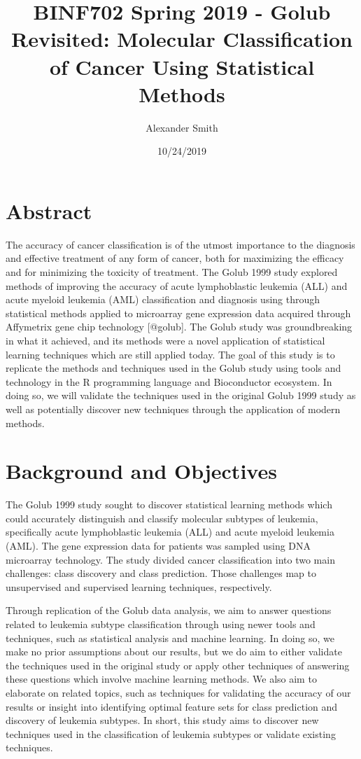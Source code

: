 \documentclass[]{article}
\title{BINF702 Spring 2019 - Golub Revisited: Molecular Classification of
Cancer Using Statistical Methods}
\author{Alexander Smith}
\date{10/24/2019}
\begin{document}
\maketitle

\section{Abstract}\label{abstract}

The accuracy of cancer classification is of the utmost importance to the
diagnosis and effective treatment of any form of cancer, both for
maximizing the efficacy and for minimizing the toxicity of treatment.
The Golub 1999 study explored methods of improving the accuracy of acute
lymphoblastic leukemia (ALL) and acute myeloid leukemia (AML)
classification and diagnosis using through statistical methods applied
to microarray gene expression data acquired through Affymetrix gene chip
technology {[}@golub{]}. The Golub study was groundbreaking in what it
achieved, and its methods were a novel application of statistical
learning techniques which are still applied today. The goal of this
study is to replicate the methods and techniques used in the Golub study
using tools and technology in the R programming language and
Bioconductor ecosystem. In doing so, we will validate the techniques
used in the original Golub 1999 study as well as potentially discover
new techniques through the application of modern methods.

\section{Background and Objectives}\label{background-and-objectives}

The Golub 1999 study sought to discover statistical learning methods
which could accurately distinguish and classify molecular subtypes of
leukemia, specifically acute lymphoblastic leukemia (ALL) and acute
myeloid leukemia (AML). The gene expression data for patients was
sampled using DNA microarray technology. The study divided cancer
classification into two main challenges: class discovery and class
prediction. Those challenges map to unsupervised and supervised learning
techniques, respectively.

Through replication of the Golub data analysis, we aim to answer
questions related to leukemia subtype classification through using newer
tools and techniques, such as statistical analysis and machine learning.
In doing so, we make no prior assumptions about our results, but we do
aim to either validate the techniques used in the original study or
apply other techniques of answering these questions which involve
machine learning methods. We also aim to elaborate on related topics,
such as techniques for validating the accuracy of our results or insight
into identifying optimal feature sets for class prediction and discovery
of leukemia subtypes. In short, this study aims to discover new
techniques used in the classification of leukemia subtypes or validate
existing techniques.
\end{document}
